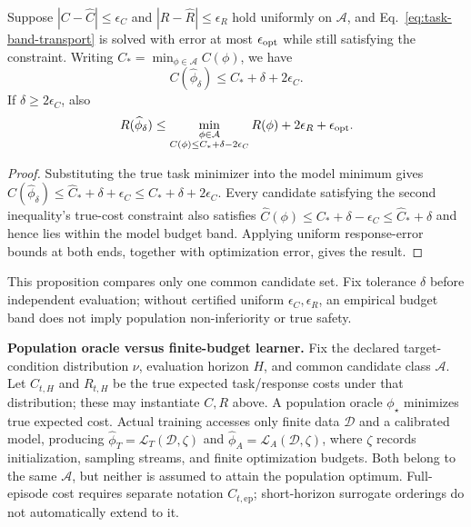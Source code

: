 \begin{proposition}
Suppose $|C-\widehat C|\le\epsilon_C$ and
$|R-\widehat R|\le\epsilon_R$ hold uniformly on $\mathcal A$, and Eq.~\eqref{eq:task-band-transport}
is solved with error at most $\epsilon_{\rm opt}$ while still satisfying the constraint. Writing
$C_*=\min_{\phi\in\mathcal A}C(\phi)$, we have
\begin{equation}
 C(\widehat\phi_\delta)\le C_*+\delta+2\epsilon_C.
\end{equation}
If $\delta\ge2\epsilon_C$, also
\begin{equation}
 R(\widehat\phi_\delta)\le
 \min_{\substack{\phi\in\mathcal A\\C(\phi)\le C_*+\delta-2\epsilon_C}}
 R(\phi)+2\epsilon_R+\epsilon_{\rm opt}.
\end{equation}
\end{proposition}
\begin{proof}
Substituting the true task minimizer into the model minimum gives
$C(\widehat\phi_\delta)\le\widehat C_*+\delta+\epsilon_C
\le C_*+\delta+2\epsilon_C$. Every candidate satisfying the second inequality's true-cost constraint also satisfies
$\widehat C(\phi)\le C_*+\delta-\epsilon_C
\le\widehat C_*+\delta$ and hence lies within the model budget band. Applying uniform
response-error bounds at both ends, together with optimization error, gives the result.
\end{proof}
This proposition compares only one common candidate set. Fix tolerance $\delta$ before independent evaluation;
without certified uniform $\epsilon_C,\epsilon_R$, an empirical budget band does not imply population non-inferiority or true safety.

\textbf{Population oracle versus finite-budget learner.} Fix the declared target-condition distribution
$\nu$, evaluation horizon $H$, and common candidate class $\mathcal A$. Let $C_{t,H}$ and $R_{t,H}$
be the true expected task/response costs under that distribution; these may instantiate $C,R$ above.
A population oracle $\phi_\star$ minimizes true expected cost. Actual training accesses only finite data
$\mathcal D$ and a calibrated model, producing
$\widehat\phi_T=\mathcal L_T(\mathcal D,\zeta)$ and
$\widehat\phi_A=\mathcal L_A(\mathcal D,\zeta)$, where $\zeta$ records initialization, sampling streams, and
finite optimization budgets. Both belong to the same $\mathcal A$, but neither is assumed to attain the population optimum.
Full-episode cost requires separate notation $C_{t,\mathrm{ep}}$; short-horizon surrogate orderings do not automatically
extend to it.

